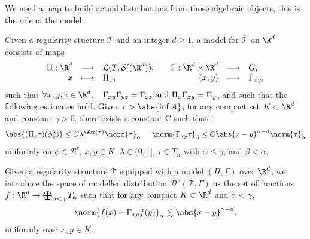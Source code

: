 We need a map to build actual distributions from those algebraic objects, this is the role of the model:
\begin{definition}[Model]
    Given a regularity stucture $\mathcal{T}$ and an integer $d\geq 1$, a model for $\mathcal{T}$ on $\R^d$ consists of maps
  \begin{equation*}
    \begin{array}{rcl}
        \Pi : \R^d &\longrightarrow &\mathcal{L}(T, \mathcal{S}'(\R^d)), \\
         x              & \longmapsto     & \Pi_x,
    \end{array} \quad 
    \begin{array}{rcl}
                    \Gamma : \R^d \times \R^d &\longrightarrow &G, \\
                    (x,y)              & \longmapsto     & \Gamma_{xy},
    \end{array}
    \end{equation*}
    such that $\forall x,y,z \in \R^d, \quad \Gamma_{xy}\Gamma_{yz} =\Gamma_{xz} \text{ and } \Pi_x \Gamma_{xy} = \Pi_y$, and such that the following estimates hold.
    Given $r>\abs{\inf A}$, for any compact set $K\subset \R^d$ and constant $\gamma >0$, there exists a constant C such that :
    \begin{equation}
        \abs{(\Pi_x \tau)(\phi^\lambda_x)}\leq C\lambda^{\abs{\tau}}\norm{\tau}_\alpha,\quad \norm{\Gamma_{xy} \tau}_\beta \leq C \abs{x - y}^{\alpha - \beta} \norm{\tau}_\alpha
    \end{equation}
    uniformly on $\phi \in \mathcal{B}^r$, $x,y\in K$, $\lambda\in (0,1]$, $\tau \in T_\alpha$ with $\alpha\leq \gamma$, and $\beta<\alpha$.
\end{definition}

\begin{definition}
    Given a regularity structure $\mathcal{T}$ equipped with a model $(\Pi, \Gamma)$ over $\R^d$, we introduce the space of modelled distribution $\mathcal{D}^\gamma (\mathcal{T}, \Gamma)$ as the set of functions $f:\R^d \rightarrow \bigoplus_{\alpha<\gamma}T_\alpha$ such that
    for any compact $K\subset \R^d$ and $\alpha <\gamma$, 
    \begin{equation*}
        \norm{f(x) - \Gamma_{xy}f(y)}_\alpha \lesssim \abs{x-y}^{\gamma - \alpha},
    \end{equation*}
    uniformly over $x,y \in K$.
\end{definition}

